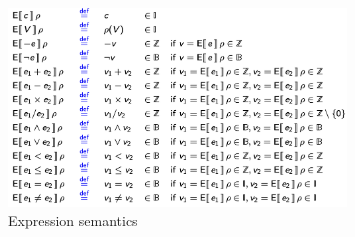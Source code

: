 \documentclass[toc, titlepaged]{../cs-classes/cs-classes}
\begin{document}
\begin{figure}[H]
    \centering
    \includegraphics[width=0.8\textwidth]{images/expression-semantics.png}
    \caption{Expression semantics}
\end{figure}
\end{document}

